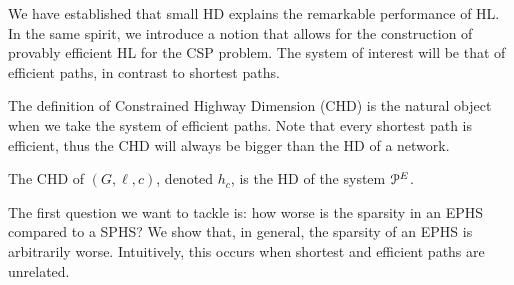 
We have established that small HD explains the remarkable performance of HL.
In the same spirit, we introduce a notion that allows for the construction of provably efficient HL for the CSP problem.
The system of interest will be that of efficient paths, in contrast to shortest paths.


The definition of Constrained Highway Dimension (CHD) is the natural object when we take the system of efficient paths.
Note that every shortest path is efficient, thus the CHD will always be bigger than the HD of a network.

\begin{definition}
The CHD of $(G,\ell,c)$, denoted $h_c$, is the HD of the system $\mathcal{P}^E$.
\end{definition}

The first question we want to tackle is: how worse is the sparsity in an EPHS compared to a SPHS?
We show that, in general, the sparsity of an EPHS is arbitrarily worse.
Intuitively, this occurs when shortest and efficient paths are unrelated. 

